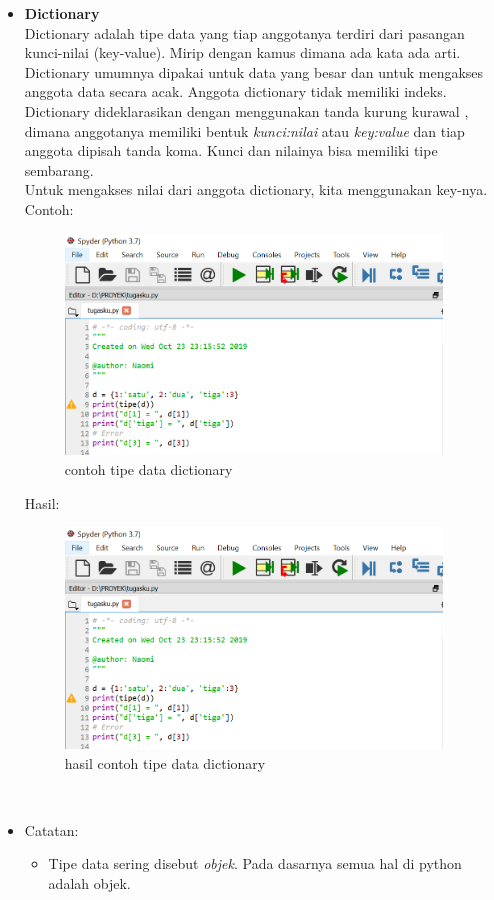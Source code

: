 \begin{enumerate}
\begin{itemize}
\newpage
\item \textbf{Dictionary}\\
Dictionary adalah tipe data yang tiap anggotanya terdiri dari pasangan kunci-nilai (key-value). Mirip dengan kamus dimana ada kata ada arti. Dictionary umumnya dipakai untuk data yang besar dan untuk mengakses anggota data secara acak. Anggota dictionary tidak memiliki indeks. Dictionary dideklarasikan dengan menggunakan tanda kurung kurawal { }, dimana anggotanya memiliki bentuk \textit{kunci:nilai} atau \textit{key:value} dan tiap anggota dipisah tanda koma. Kunci dan nilainya bisa memiliki tipe sembarang.\\Untuk mengakses nilai dari anggota dictionary, kita menggunakan key-nya. Contoh:
\begin{figure}[!htbp]
\centering
\includegraphics[width=10cm]{gambar2/cth6.png}
\caption{contoh tipe data dictionary}
\end{figure}
Hasil:
\begin{figure}[!htbp]
\centering
\includegraphics[width=10cm]{gambar2/cth6.png}
\caption{hasil contoh tipe data dictionary}
\end{figure}\\
\item Catatan:
\begin{itemize}
\item Tipe data sering disebut \textit{objek}. Pada dasarnya semua hal di python adalah objek.

\end{itemize}
\end{itemize}
\end{enumerate}
